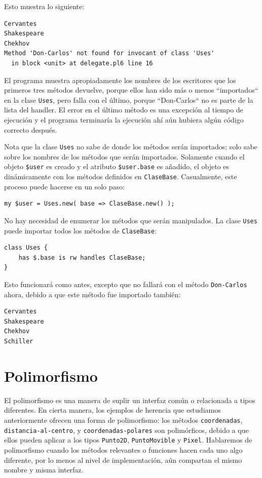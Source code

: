 Esto muestra lo siguiente:

\begin{verbatim}
Cervantes
Shakespeare
Chekhov
Method 'Don-Carlos' not found for invocant of class 'Uses'
  in block <unit> at delegate.pl6 line 16
\end{verbatim}

El programa muestra apropiadamente los nombres de los
escritores que los primeros tres métodos devuelve, porque ellos
han sido más o menos ``importados`` en la clase {\tt Uses}, pero 
falla con el último, porque ``Don-Carlos`` no es parte de la 
lista del handler. El error en el último método es una excepción al
tiempo de ejecución y el programa terminaría la ejecución ahí aún
hubiera algún código correcto después. 

Nota que la clase {\tt Uses} no sabe de donde los métodos 
serán importados; solo sabe sobre los nombres de los 
métodos que serán importados. Solamente cuando el objeto
\verb|$user| es creado y el atributo \verb|$user.base|
es añadido, el objeto es dinámicamente con los métodos
definidos en {\tt ClaseBase}. Casualmente, este proceso
puede hacerse en un solo paso:

\begin{verbatim}
my $user = Uses.new( base => ClaseBase.new() );
\end{verbatim}

No hay necesidad de enumerar los métodos que serán manipulados.
La clase {\tt Uses} puede importar todos los métodos de 
{\tt ClaseBase}:

\begin{verbatim}
class Uses { 
    has $.base is rw handles ClaseBase;
}
\end{verbatim}

Esto funcionará como antes, excepto que no fallará con el método
{\tt Don-Carlos} ahora, debido a que este método fue importado también:

\begin{verbatim}
Cervantes
Shakespeare
Chekhov
Schiller
\end{verbatim} 

\section{Polimorfismo}

El polimorfismo es una manera de suplir un interfaz común o 
relacionada a tipos diferentes. En cierta manera, los ejemplos
de herencia que estudiamos anteriormente ofrecen una forma
de polimorfismo: los métodos {\tt coordenadas}, {\tt distancia-al-centro}, y {\tt coordenadas-polares} son polimórficos, debido a que ellos pueden aplicar a los tipos
{\tt Punto2D}, {\tt PuntoMovible} y {\tt Pixel}. Hablaremos de
polimorfismo cuando los métodos relevantes o funciones hacen cada uno algo diferente, por lo menos al nivel de implementación, aún
compartan el mismo nombre y misma interfaz.

